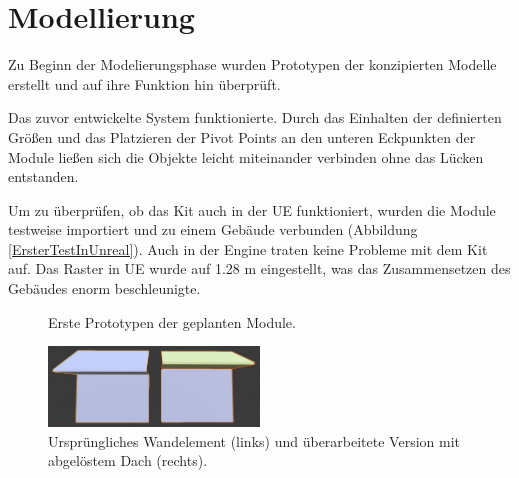 \section{Modellierung}
Zu Beginn der Modelierungsphase wurden Prototypen der konzipierten Modelle erstellt und auf ihre Funktion hin überprüft.
\par
Das zuvor entwickelte System funktionierte. Durch das Einhalten der definierten Größen und das Platzieren der Pivot Points an den unteren Eckpunkten der Module ließen sich die Objekte leicht miteinander verbinden ohne das Lücken entstanden.
\par
Um zu überprüfen, ob das Kit auch in der UE funktioniert, wurden die Module testweise importiert und zu einem Gebäude verbunden (Abbildung \ref{ErsterTestInUnreal}). Auch in der Engine traten keine Probleme mit dem Kit auf. Das Raster in UE wurde auf 1.28 m eingestellt, was das Zusammensetzen des Gebäudes enorm beschleunigte.
\begin{figure}[H]
\centering
  \qquad
  \caption{Erste Prototypen der geplanten Module.}%
\label{ErsterModulTest}
\end{figure}
\vspace{-10.5pt}
\begin{figure}
  \centering 
  \vspace{-11.5pt}
    \includegraphics[width=0.5\textwidth]{bilder/Wallrework}
      \caption{Ursprüngliches Wandelement (links) und überarbeitete Version mit abgelöstem Dach (rechts).}\label{Wallrework}
          \vspace{-10pt}
\end{figure}
